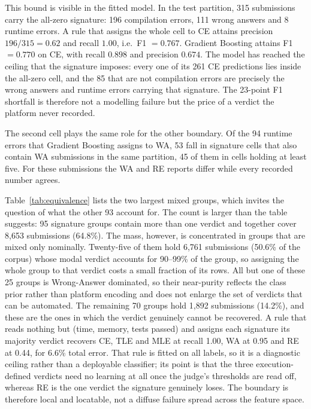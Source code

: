 \documentclass[acmsmall]{acmart}
\begin{document}
This bound is visible in the fitted model. In the test partition, 315
submissions carry the all-zero signature: 196 compilation errors, 111 wrong
answers and 8 runtime errors. A rule that assigns the whole cell to CE attains
precision $196/315=0.62$ and recall $1.00$, i.e.\ F1 $=0.767$. Gradient
Boosting attains F1 $=0.770$ on CE, with recall $0.898$ and precision $0.674$.
The model has reached the ceiling that the signature imposes: every one of its
261 CE predictions lies inside the all-zero cell, and the 85 that are not
compilation errors are precisely the wrong answers and runtime errors carrying
that signature. The 23-point F1 shortfall is therefore not a
modelling failure but the price of a verdict the platform never recorded.

The second cell plays the same role for the other boundary. Of the 94 runtime
errors that Gradient Boosting assigns to WA, 53 fall in signature cells that
also contain WA submissions in the same partition, 45 of them in cells holding
at least five. For these submissions the WA and RE reports differ while every
recorded number agrees.

Table~\ref{tab:equivalence} lists the two largest mixed groups, which invites the
question of what the other 93 account for. The count is larger than the table
suggests: 95 signature groups contain more than one verdict and together cover
8{,}653 submissions (64.8\%). The mass, however, is concentrated in groups that
are mixed only nominally. Twenty-five of them hold 6{,}761 submissions (50.6\% of
the corpus) whose modal verdict accounts for 90--99\% of the group, so assigning
the whole group to that verdict costs a small fraction of its rows. All but one
of these 25 groups is Wrong-Answer dominated, so their near-purity reflects the
class prior rather than platform encoding and does not enlarge the set of
verdicts that can be automated. The remaining
70 groups hold 1{,}892 submissions (14.2\%), and these are the ones in which the
verdict genuinely cannot be recovered. A rule that reads nothing but (time,
memory, tests passed) and assigns each signature its majority verdict recovers
CE, TLE and MLE at recall 1.00, WA at 0.95 and RE at 0.44, for 6.6\% total error.
That rule is fitted on all labels, so it is a diagnostic ceiling rather than a
deployable classifier; its point is that the three execution-defined verdicts
need no learning at all once the judge's thresholds are read off, whereas RE is
the one verdict the signature genuinely loses. The boundary is therefore local
and locatable, not a diffuse failure spread across the feature space.
\end{document}
